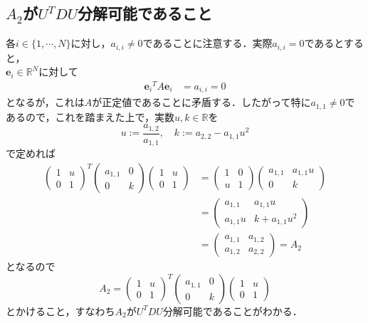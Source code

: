 \documentclass{jsarticle}
\theoremstyle{definition}
\theoremstyle{mystyle} %
\begin{document}
\subsection*{\Large $A_2$が$U^TDU$分解可能であること}
各$i\in \{1,\cdots ,N\}$に対し，$a_{i,i}\neq 0$であることに注意する．実際$a_{i,i}=0$であるとすると，\\
$\displaystyle {\bm e}_i\in \mathbb{R}^N$に対して
\begin{align*}
{{\bm e}_i}^TA{\bm e}_i&=a_{i,i}=0
\end{align*}
となるが，これは$A$が正定値であることに矛盾する．したがって特に$a_{1,1}\neq 0$であるので，これを踏まえた上で，実数$u,k\in \mathbb{R}$を
$$u:= \frac{a_{1,2}}{a_{1,1}},\quad k:=a_{2,2}-a_{1,1}u^2$$
で定めれば
\begin{align*}
\begin{pmatrix}
1 & u\\
0 & 1
\end{pmatrix}^T\begin{pmatrix}
a_{1,1} & 0\\
0 & k
\end{pmatrix}\begin{pmatrix}
1 & u\\
0 & 1
\end{pmatrix}&=\begin{pmatrix}
1 & 0\\
u & 1
\end{pmatrix}\begin{pmatrix}
a_{1,1} & a_{1,1}u\\
0 & k
\end{pmatrix}\\
&=\begin{pmatrix}
a_{1,1} & a_{1,1}u\\
a_{1,1}u & k+a_{1,1}u^2
\end{pmatrix}\\
&=\begin{pmatrix}
a_{1,1} & a_{1,2}\\
a_{1,2} & a_{2,2}
\end{pmatrix}=A_2
\end{align*}
となるので
$$A_2=\begin{pmatrix}
1 & u\\
0 & 1
\end{pmatrix}^T\begin{pmatrix}
a_{1,1} & 0\\
0 & k
\end{pmatrix}\begin{pmatrix}
1 & u\\
0 & 1
\end{pmatrix}$$
とかけること，すなわち$A_2$が$U^TDU$分解可能であることがわかる．\\
\end{document}
